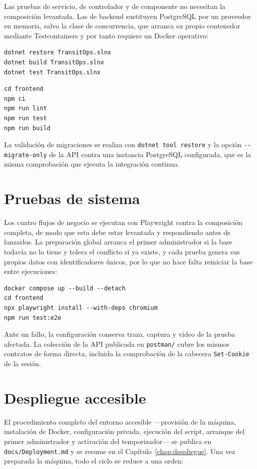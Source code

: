 Las pruebas de servicio, de controlador y de componente no necesitan la composición levantada. Las de backend sustituyen PostgreSQL por un proveedor en memoria, salvo la clase de concurrencia, que arranca su propio contenedor mediante Testcontainers y por tanto requiere un Docker operativo:

\begin{verbatim}
dotnet restore TransitOps.slnx
dotnet build TransitOps.slnx
dotnet test TransitOps.slnx
\end{verbatim}

\begin{verbatim}
cd frontend
npm ci
npm run lint
npm run test
npm run build
\end{verbatim}

La validación de migraciones se realiza con \texttt{dotnet tool restore} y la opción \texttt{-{}-migrate-only} de la API contra una instancia PostgreSQL configurada, que es la misma comprobación que ejecuta la integración continua.

\section{Pruebas de sistema}

Los cuatro flujos de negocio se ejecutan con Playwright contra la composición completa, de modo que esta debe estar levantada y respondiendo antes de lanzarlos. La preparación global arranca el primer administrador si la base todavía no lo tiene y tolera el conflicto si ya existe, y cada prueba genera sus propios datos con identificadores únicos, por lo que no hace falta reiniciar la base entre ejecuciones:

\begin{verbatim}
docker compose up --build --detach
cd frontend
npx playwright install --with-deps chromium
npm run test:e2e
\end{verbatim}

Ante un fallo, la configuración conserva traza, captura y vídeo de la prueba afectada. La colección de la API publicada en \texttt{postman/} cubre los mismos contratos de forma directa, incluida la comprobación de la cabecera \texttt{Set-Cookie} de la sesión.

\section{Despliegue accesible}

El procedimiento completo del entorno accesible ---provisión de la máquina, instalación de Docker, configuración privada, ejecución del script, arranque del primer administrador y activación del temporizador--- se publica en \texttt{docs/Deployment.md} y se resume en el Capítulo~\ref{chap:despliegue}. Una vez preparada la máquina, todo el ciclo se reduce a una orden:

